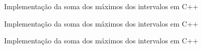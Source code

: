 \begin{frame}[fragile]{Implementação da soma dos máximos dos intervalos em C++}
\end{frame}

\begin{frame}[fragile]{Implementação da soma dos máximos dos intervalos em C++}
\end{frame}

\begin{frame}[fragile]{Implementação da soma dos máximos dos intervalos em C++}
\end{frame}
